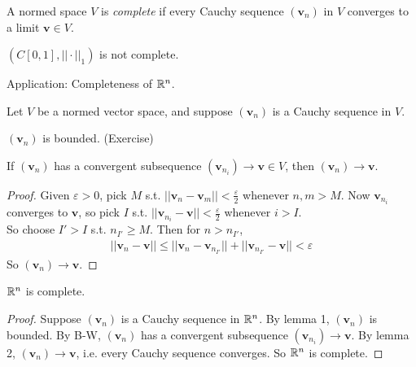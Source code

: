 \documentclass[a4paper]{article}
\begin{document}
\begin{defi}
A normed space $V$ is \emph{complete} if every Cauchy sequence $\left(\mathbf{v}_n\right)$ in $V$ converges to a limit $\mathbf{v} \in V$.
\end{defi}

\begin{eg}
$\left(C\left[0,1\right],||\cdot||_1\right)$ is not complete.
\end{eg}

Application: Completeness of $\mathbb{R}^n$.

Let $V$ be a normed vector space, and suppose $\left(\mathbf{v}_n\right)$ is a Cauchy sequence in $V$.

\begin{lemma}
$\left(\mathbf{v}_n\right)$ is bounded. (Exercise)
\end{lemma}

\begin{lemma}
If $\left(\mathbf{v}_n\right)$ has a convergent subsequence $\left(\mathbf{v}_{n_i}\right) \to \mathbf{v} \in V$, then $\left(\mathbf{v}_n\right) \to \mathbf{v}$.
\begin{proof}
Given $\varepsilon>0$, pick $M$ s.t. $||\mathbf{v}_n - \mathbf{v}_m|| < \frac{\varepsilon}{2}$ whenever $n,m > M$. Now $\mathbf{v}_{n_i}$ converges to $\mathbf{v}$, so pick $I$ s.t. $||\mathbf{v}_{n_i}-\mathbf{v}|| < \frac{\varepsilon}{2}$ whenever $i>I$.\\
So choose $I'>I$ s.t. $n_{I'} \geq M$. Then for $n>n_{I'}$,
\begin{equation*}
\begin{aligned}
||\mathbf{v}_n - \mathbf{v}|| \leq ||\mathbf{v}_n - \mathbf{v}_{n_{I'}}|| + ||\mathbf{v}_{n_{I'}} - \mathbf{v}|| < \varepsilon
\end{aligned}
\end{equation*}
So $\left(\mathbf{v}_n\right) \to \mathbf{v}$.
\end{proof}
\end{lemma}

\begin{thm}
$\mathbb{R}^n$ is complete.
\begin{proof}
Suppose $\left(\mathbf{v}_n\right)$ is a Cauchy sequence in $\mathbb{R}^n$. By lemma 1, $\left(\mathbf{v}_n\right)$ is bounded. By B-W, $\left(\mathbf{v}_n\right)$ has a convergent subsequence $\left(\mathbf{v}_{n_i}\right)\to \mathbf{v}$. By lemma 2, $\left(\mathbf{v}_n\right) \to \mathbf{v}$, i.e. every Cauchy sequence converges. So $\mathbb{R}^n$ is complete.
\end{proof}
\end{thm}
\end{document}
